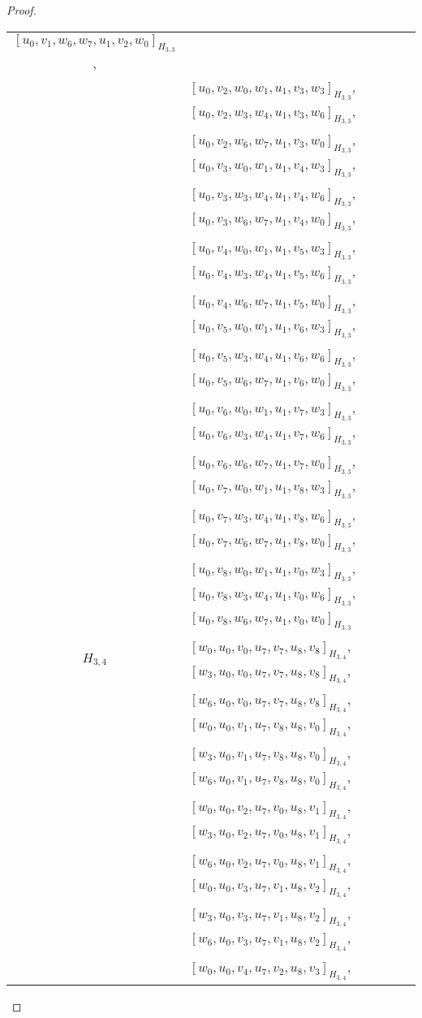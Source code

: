 \begin{subappendices}
\begin{proof}
{\begin{longtable}{|c|l|}
  $[u_0, v_1, w_6, w_7, u_1, v_2, w_0]_{H_{3,3}}$, \\* &
  $[u_0, v_2, w_0, w_1, u_1, v_3, w_3]_{H_{3,3}}$,
  $[u_0, v_2, w_3, w_4, u_1, v_3, w_6]_{H_{3,3}}$, \\* &
  $[u_0, v_2, w_6, w_7, u_1, v_3, w_0]_{H_{3,3}}$,
  $[u_0, v_3, w_0, w_1, u_1, v_4, w_3]_{H_{3,3}}$, \\* &
  $[u_0, v_3, w_3, w_4, u_1, v_4, w_6]_{H_{3,3}}$,
  $[u_0, v_3, w_6, w_7, u_1, v_4, w_0]_{H_{3,3}}$, \\* &
  $[u_0, v_4, w_0, w_1, u_1, v_5, w_3]_{H_{3,3}}$,
  $[u_0, v_4, w_3, w_4, u_1, v_5, w_6]_{H_{3,3}}$, \\* &
  $[u_0, v_4, w_6, w_7, u_1, v_5, w_0]_{H_{3,3}}$,
  $[u_0, v_5, w_0, w_1, u_1, v_6, w_3]_{H_{3,3}}$, \\* &
  $[u_0, v_5, w_3, w_4, u_1, v_6, w_6]_{H_{3,3}}$,
  $[u_0, v_5, w_6, w_7, u_1, v_6, w_0]_{H_{3,3}}$, \\* &
  $[u_0, v_6, w_0, w_1, u_1, v_7, w_3]_{H_{3,3}}$,
  $[u_0, v_6, w_3, w_4, u_1, v_7, w_6]_{H_{3,3}}$, \\* &
  $[u_0, v_6, w_6, w_7, u_1, v_7, w_0]_{H_{3,3}}$,
  $[u_0, v_7, w_0, w_1, u_1, v_8, w_3]_{H_{3,3}}$, \\* &
  $[u_0, v_7, w_3, w_4, u_1, v_8, w_6]_{H_{3,3}}$,
  $[u_0, v_7, w_6, w_7, u_1, v_8, w_0]_{H_{3,3}}$, \\* &
  $[u_0, v_8, w_0, w_1, u_1, v_0, w_3]_{H_{3,3}}$,
  $[u_0, v_8, w_3, w_4, u_1, v_0, w_6]_{H_{3,3}}$, \\* &
  $[u_0, v_8, w_6, w_7, u_1, v_0, w_0]_{H_{3,3}}$
\\ \hline
$H_{3,4}$ &
  $[w_0, u_0, v_0, u_7, v_7, u_8, v_8]_{H_{3,4}}$,
  $[w_3, u_0, v_0, u_7, v_7, u_8, v_8]_{H_{3,4}}$, \\* &
  $[w_6, u_0, v_0, u_7, v_7, u_8, v_8]_{H_{3,4}}$,
  $[w_0, u_0, v_1, u_7, v_8, u_8, v_0]_{H_{3,4}}$, \\* &
  $[w_3, u_0, v_1, u_7, v_8, u_8, v_0]_{H_{3,4}}$,
  $[w_6, u_0, v_1, u_7, v_8, u_8, v_0]_{H_{3,4}}$, \\* &
  $[w_0, u_0, v_2, u_7, v_0, u_8, v_1]_{H_{3,4}}$,
  $[w_3, u_0, v_2, u_7, v_0, u_8, v_1]_{H_{3,4}}$, \\* &
  $[w_6, u_0, v_2, u_7, v_0, u_8, v_1]_{H_{3,4}}$,
  $[w_0, u_0, v_3, u_7, v_1, u_8, v_2]_{H_{3,4}}$, \\* &
  $[w_3, u_0, v_3, u_7, v_1, u_8, v_2]_{H_{3,4}}$,
  $[w_6, u_0, v_3, u_7, v_1, u_8, v_2]_{H_{3,4}}$, \\* &
  $[w_0, u_0, v_4, u_7, v_2, u_8, v_3]_{H_{3,4}}$,

\end{longtable}}
\end{proof}
\end{subappendices}
